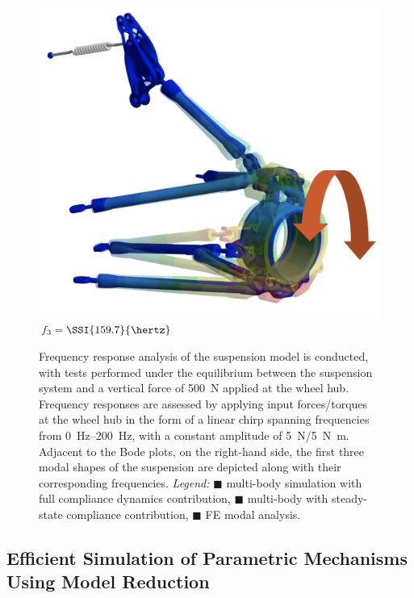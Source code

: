 \begin{figure}[htb]
\begin{minipage}[c]{0.125\linewidth}
\begin{center}
      \includegraphics[width=1.0\linewidth]{./figures/appendix_4/mode3.png} \\ \small{$f_3 = \SSI{159.7}{\hertz}$} \\
    \end{center}
  \end{minipage}
  \caption{Frequency response analysis of the suspension model is conducted, with tests performed under the equilibrium between the suspension system and a vertical force of \SI{500}{\newton} applied at the wheel hub. Frequency responses are assessed by applying input forces/torques at the wheel hub in the form of a linear chirp spanning frequencies from \SIrange{0}{200}{\hertz}, with a constant amplitude of \SI{5}{\newton}/\SI{5}{\newton\meter}. Adjacent to the Bode plots, on the right-hand side, the first three modal shapes of the suspension are depicted along with their corresponding frequencies. \emph{Legend:} {\color{mycolor1}$\blacksquare$} \Simulink{} multi-body simulation with full compliance dynamics contribution, {\color{mycolor2}$\blacksquare$} \Simulink{} multi-body with steady-state compliance contribution, {\color{mycolor3}$\blacksquare$} \Ansys{} \ac{FE} modal analysis.}
  \label{app4:fig:suspension_dynamic_results}
\end{figure}

\subsection{Efficient Simulation of Parametric Mechanisms Using Model Reduction}

